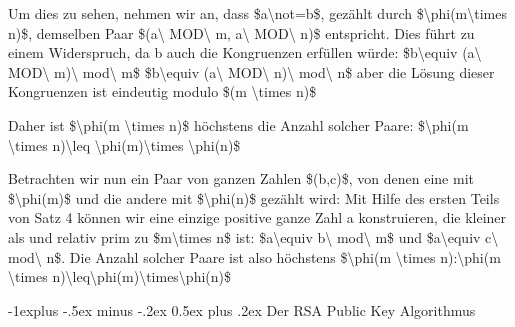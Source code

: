 \documentclass[a4paper]{article}
\makeatletter
\renewcommand{\subsection}{\@startsection{subsection}{2}{0mm}%
 {-1explus -.5ex minus -.2ex}%
 {0.5ex plus .2ex}%
 {\normalfont\normalsize\bfseries}}
\makeatother
\begin{document}
\begin{multicols}{3}
\begin{itemize*}
\begin{itemize*}
\begin{itemize*}
                        \begin{itemize*} \item Um dies zu sehen, nehmen wir an, dass \$a\textbackslash not=b\$, gezählt durch \$\textbackslash phi(m\textbackslash times n)\$, demselben Paar \$(a\textbackslash{} MOD\textbackslash{} m, a\textbackslash{} MOD\textbackslash{} n)\$ entspricht. Dies führt zu einem Widerspruch, da b auch die Kongruenzen erfüllen würde: \$b\textbackslash equiv (a\textbackslash{} MOD\textbackslash{} m)\textbackslash{} mod\textbackslash{} m\$ \$b\textbackslash equiv (a\textbackslash{} MOD\textbackslash{} n)\textbackslash{} mod\textbackslash{} n\$ aber die Lösung dieser Kongruenzen ist eindeutig modulo \$(m \textbackslash times n)\$ \item Daher ist \$\textbackslash phi(m \textbackslash times n)\$ höchstens die Anzahl solcher Paare: \$\textbackslash phi(m \textbackslash times n)\textbackslash leq \textbackslash phi(m)\textbackslash times \textbackslash phi(n)\$ \end{itemize*} \item Betrachten wir nun ein Paar von ganzen Zahlen \$(b,c)\$, von denen eine mit \$\textbackslash phi(m)\$ und die andere mit \$\textbackslash phi(n)\$ gezählt wird: Mit Hilfe des ersten Teils von Satz 4 können wir eine einzige positive ganze Zahl a konstruieren, die kleiner als und relativ prim zu \$m\textbackslash times n\$ ist: \$a\textbackslash equiv b\textbackslash{} mod\textbackslash{} m\$ und \$a\textbackslash equiv c\textbackslash{} mod\textbackslash{} n\$. Die Anzahl solcher Paare ist also höchstens \$\textbackslash phi(m \textbackslash times n):\textbackslash phi(m \textbackslash times n)\textbackslash leq\textbackslash phi(m)\textbackslash times\textbackslash phi(n)\$ \end{itemize*}
            \end{itemize*}
      \end{itemize*}


      \subsection{Der RSA Public Key
            Algorithmus}


\end{multicols}
\end{document}
